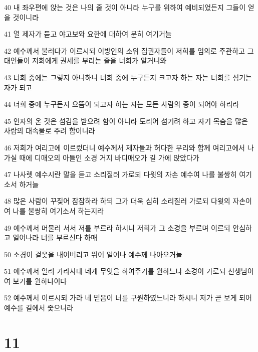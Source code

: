 \par 40 내 좌우편에 앉는 것은 나의 줄 것이 아니라 누구를 위하여 예비되었든지 그들이 얻을 것이니라
\par 41 열 제자가 듣고 야고보와 요한에 대하여 분히 여기거늘
\par 42 예수께서 불러다가 이르시되 이방인의 소위 집권자들이 저희를 임의로 주관하고 그 대인들이 저희에게 권세를 부리는 줄을 너희가 알거니와
\par 43 너희 중에는 그렇지 아니하니 너희 중에 누구든지 크고자 하는 자는 너희를 섬기는 자가 되고
\par 44 너희 중에 누구든지 으뜸이 되고자 하는 자는 모든 사람의 종이 되어야 하리라
\par 45 인자의 온 것은 섬김을 받으려 함이 아니라 도리어 섬기려 하고 자기 목숨을 많은 사람의 대속물로 주려 함이니라
\par 46 저희가 여리고에 이르렀더니 예수께서 제자들과 허다한 무리와 함께 여리고에서 나가실 때에 디매오의 아들인 소경 거지 바디매오가 길 가에 앉았다가
\par 47 나사렛 예수시란 말을 듣고 소리질러 가로되 다윗의 자손 예수여 나를 불쌍히 여기소서 하거늘
\par 48 많은 사람이 꾸짖어 잠잠하라 하되 그가 더욱 심히 소리질러 가로되 다윗의 자손이여 나를 불쌍히 여기소서 하는지라
\par 49 예수께서 머물러 서서 저를 부르라 하시니 저희가 그 소경을 부르며 이르되 안심하고 일어나라 너를 부르신다 하매
\par 50 소경이 겉옷을 내어버리고 뛰어 일어나 예수께 나아오거늘
\par 51 예수께서 일러 가라사대 네게 무엇을 하여주기를 원하느냐 소경이 가로되 선생님이여 보기를 원하나이다
\par 52 예수께서 이르시되 가라 네 믿음이 너를 구원하였느니라 하시니 저가 곧 보게 되어 예수를 길에서 좇으니라

\chapter{11}

